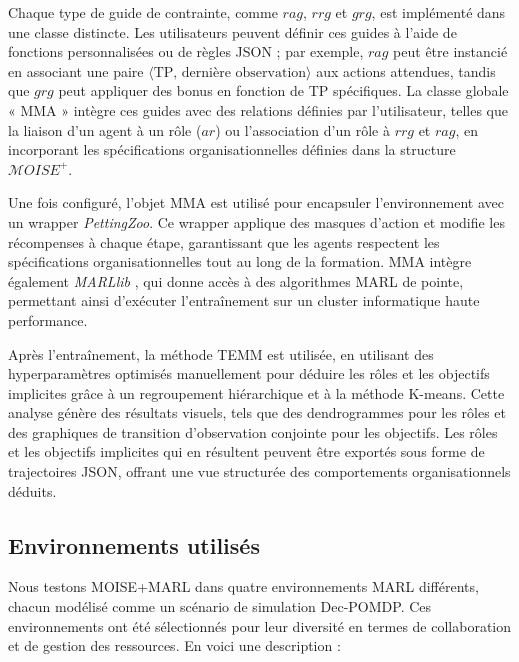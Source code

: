 Chaque type de guide de contrainte, comme $rag$, $rrg$ et $grg$, est implémenté dans une classe distincte. Les utilisateurs peuvent définir ces guides à l'aide de fonctions personnalisées ou de règles JSON ; par exemple, $rag$ peut être instancié en associant une paire $\langle \text{TP, dernière observation} \rangle$ aux actions attendues, tandis que $grg$ peut appliquer des bonus en fonction de TP spécifiques. La classe globale « MMA » intègre ces guides avec des relations définies par l'utilisateur, telles que la liaison d'un agent à un rôle ($ar$) ou l'association d'un rôle à $rrg$ et $rag$, en incorporant les spécifications organisationnelles définies dans la structure $\mathcal{M}OISE^+$.

Une fois configuré, l'objet MMA est utilisé pour encapsuler l'environnement avec un wrapper \textit{PettingZoo}. Ce wrapper applique des masques d'action et modifie les récompenses à chaque étape, garantissant que les agents respectent les spécifications organisationnelles tout au long de la formation. MMA intègre également \textit{MARLlib} \cite{hu2021marlib}, qui donne accès à des algorithmes MARL de pointe, permettant ainsi d'exécuter l'entraînement sur un cluster informatique haute performance.

Après l'entraînement, la méthode TEMM est utilisée, en utilisant des hyperparamètres optimisés manuellement pour déduire les rôles et les objectifs implicites grâce à un regroupement hiérarchique et à la méthode K-means. Cette analyse génère des résultats visuels, tels que des dendrogrammes pour les rôles et des graphiques de transition d'observation conjointe pour les objectifs. Les rôles et les objectifs implicites qui en résultent peuvent être exportés sous forme de trajectoires JSON, offrant une vue structurée des comportements organisationnels déduits.


\subsection{Environnements utilisés}

Nous testons MOISE+MARL dans quatre environnements MARL différents, chacun modélisé comme un scénario de simulation Dec-POMDP. Ces environnements ont été sélectionnés pour leur diversité en termes de collaboration et de gestion des ressources. En voici une description :

